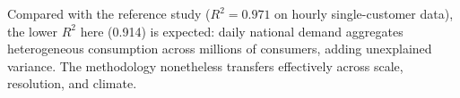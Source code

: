 Compared with the reference study \parencite{zhang2023catboostppso} ($R^2 = 0.971$ on hourly single-customer data), the lower $R^2$ here (0.914) is expected: daily national demand aggregates heterogeneous consumption across millions of consumers, adding unexplained variance. The methodology nonetheless transfers effectively across scale, resolution, and climate.
